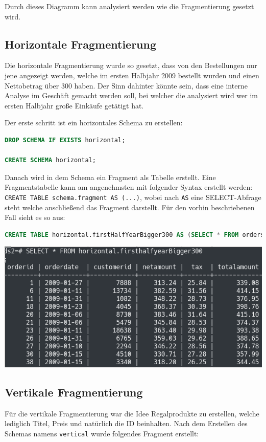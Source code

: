 Durch dieses Diagramm kann analysiert werden wie die Fragmentierung gesetzt wird.
\subsection{Horizontale Fragmentierung}
Die horizontale Fragmentierung wurde so gesetzt, dass von den Bestellungen nur jene angezeigt werden, welche im ersten Halbjahr 2009 bestellt wurden und einen Nettobetrag über 300 haben. Der Sinn dahinter könnte sein, dass eine interne Analyse im Geschäft gemacht werden soll, bei welcher die analysiert wird wer im ersten Halbjahr große Einkäufe getätigt hat.

Der erste schritt ist ein horizontales Schema zu erstellen:

\begin{lstlisting}[language=SQL]
DROP SCHEMA IF EXISTS horizontal;

CREATE SCHEMA horizontal;
\end{lstlisting}

Danach wird in dem Schema ein Fragment als Tabelle erstellt. Eine Fragmentstabelle kann am angenehmsten mit folgender Syntax erstellt werden: \verb|CREATE TABLE schema.fragment AS (...)|, wobei nach \verb|AS| eine SELECT-Abfrage steht welche anschließend das Fragment darstellt. Für den vorhin beschriebenen Fall sieht es so aus:

\begin{lstlisting}[language=SQL]
CREATE TABLE horizontal.firstHalfYearBigger300 AS (SELECT * FROM orders WHERE netamount > 300 AND orderdate < '2009-07-01');
\end{lstlisting}

\begin{minipage}{\linewidth}
	\centering
	\includegraphics[width=0.8\linewidth]{images/table2}
\end{minipage}
\subsection{Vertikale Fragmentierung}
Für die vertikale Fragmentierung war die Idee Regalprodukte zu erstellen, welche lediglich Titel, Preis und natürlich die ID beinhalten. Nach dem Erstellen des Schemas namens \verb|vertical| wurde folgendes Fragment erstellt:

